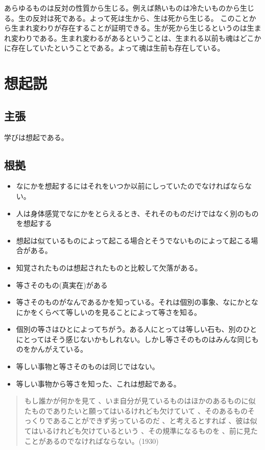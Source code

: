 \documentclass[a4j,11pt]{jarticle}
\begin{document}
あらゆるものは反対の性質から生じる。例えば熱いものは冷たいものから生じる。生の反対は死である。よって死は生から、生は死から生じる。
このことから生まれ変わりが存在することが証明できる。生が死から生じるというのは生まれ変わりである。生まれ変わるがあるということは、生まれる以前も魂はどこかに存在していたということである。よって魂は生前も存在している。

\section{想起説}
\subsection{主張}
学びは想起である。

\subsection{根拠}
\begin{itemize}
    
    \item なにかを想起するにはそれをいつか以前にしっていたのでなければならない。
    \item 人は身体感覚でなにかをとらえるとき、それそのものだけではなく別のものを想起する
    \item 想起は似ているものによって起こる場合とそうでないものによって起こる場合がある。
    \item 知覚されたものは想起されたものと比較して欠落がある。
    \item 等さそのもの(真実在)がある
    \item 等さそのものがなんであるかを知っている。それは個別の事象、なにかとなにかをくらべて等しいのを見ることによって等さを知る。
    \item 個別の等さはひとによってちがう。ある人にとっては等しい石も、別のひとにとってはそう感じないかもしれない。しかし等さそのものはみんな同じものをかんがえている。
    \item 等しい事物と等さそのものは同じではない。
    \item 等しい事物から等さを知った、これは想起である。
    
\end{itemize}

\begin{quote}
    もし誰かが何かを見て 、いま自分が見ているものはほかのあるものに似たものでありたいと願ってはいるけれども欠けていて 、そのあるものそっくりであることができず劣っているのだ 、と考えるとすれば 、彼は似てはいるけれども欠けているという 、その規準になるものを 、前に見たことがあるのでなければならない。(1930)
\end{quote}
\end{document}
